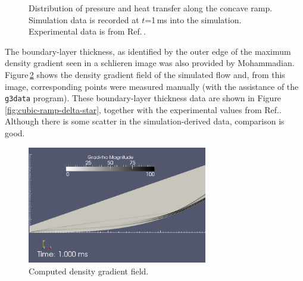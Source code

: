 \begin{figure}[htbp]
 \centering
 \caption{Distribution of pressure and heat transfer along the concave ramp.
   Simulation data is recorded at $t$=1\,ms into the simulation.
   Experimental data is from Ref.\,\cite{mohammadian_1972a}.}
 \label{fig:cubic-ramp-data-compare}
\end{figure}

\medskip
The boundary-layer thickness, as identified by the outer edge of the maximum density gradient 
seen in a schlieren image was also provided by Mohammadian.
Figure\,\ref{fig:cubic-ramp-grad-rho-field} shows the density gradient field of the simulated
flow and, from this image, corresponding points were measured manually
(with the assistance of the \verb!g3data! program).
These boundary-layer thickness data are shown in Figure\,\ref{fig:cubic-ramp-delta-star}, 
together with the experimental values from Ref.\cite{mohammadian_1972a}.
Although there is some scatter in the simulation-derived data, comparison is good.

\begin{figure}[htb]
 \centering
 \includegraphics[width=0.7\textwidth]{../2D/cubic-ramp/cubic-ramp-factor-2-grad-rho-field-1-ms-zoom-with-scale.png}
 \caption{Computed density gradient field.}
 \label{fig:cubic-ramp-grad-rho-field}
\end{figure}

